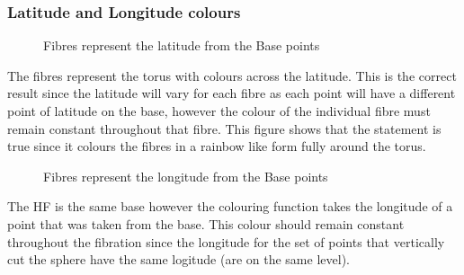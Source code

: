 \documentclass[12pt]{article} %
\begin{document}
\begin{flushleft}
\subsubsection{Latitude and Longitude colours} %
\begin{figure}[H] %
\caption{Fibres represent the latitude from the Base points}
\label{fig:speciation}
\end{figure}
The fibres represent the torus with colours across the latitude. This is the correct result since the latitude will vary for each fibre as each point will have a different point of latitude on the base, however the colour of the individual fibre must remain constant throughout that fibre. This figure shows that the statement is true since it colours the fibres in a rainbow like form fully around the torus.
\begin{figure}[H] %
\caption{Fibres represent the longitude from the Base points}
\label{fig:speciation}
\end{figure}
The HF is the same base however the colouring function takes the longitude of a point that was taken from the base. This colour should remain constant throughout the fibration since the longitude for the set of points that vertically cut the sphere have the same logitude (are on the same level).

\end{flushleft}
\end{document}
